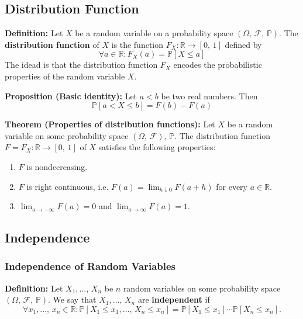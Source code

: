 \documentclass[a4paper]{extarticle}
\begin{document}
\subsection{Distribution Function}

\textbf{Definition:} Let \(X\) be a random variable on a probability space \((\Omega, \, \mathcal{F}, \, \mathbb{P})\). The \textbf{distribution function} of \(X\) is the function \(F_X : \mathbb{R} \to [0, \, 1]\) defined by
\[
    \forall a \in \mathbb{R} : F_X(a) = \mathbb{P}[X \leq a]
\]
The idead is that the distribution function \(F_X\) encodes the probabilistic properties of the random variable \(X\).

\begin{tbox}
    \textbf{Proposition (Basic identity):} Let \(a < b\) be two real numbers. Then
    \[
        \mathbb{P}[a < X \leq b] = F(b) - F(a)
    \]
\end{tbox}

\begin{tbox}
    \textbf{Theorem (Properties of distribution functions):} Let \(X\) be a random variable on some probability space \((\Omega, \, \mathcal{F}), \, \mathbb{P}\). The distribution function \(F = F_X : \mathbb{R} \to [0, \, 1]\) of \(X\) satisfies the following properties:
    \begin{enumerate}
        \item \(F\) is nondecreasing.
        \item \(F\) is right continuous, i.e. \(F(a) = \lim_{h \downarrow 0}F(a + h)\) for every \(a \in \mathbb{R}\).
        \item \(\lim_{a \to - \infty} F(a) = 0\) and \(\lim_{a \to \infty} F(a) = 1\).
    \end{enumerate}
\end{tbox}

\subsection{Independence}

\subsubsection{Independence of Random Variables}

\textbf{Definition:} Let \(X_1,..., \, X_n\) be \(n\) random variables on some probability space \((\Omega, \, \mathcal{F}, \, \mathbb{P})\). We say that \(X_1,..., \, X_n\) are \textbf{independent} if
\[
    \forall x_1,..., \, x_n \in \mathbb{R} : \mathbb{P}[X_1 \leq x_1,..., \, X_n \leq x_n] = \mathbb{P}[X_1 \leq x_1] \cdots \mathbb{P}[X_n \leq x_n].
\]
\end{document}
